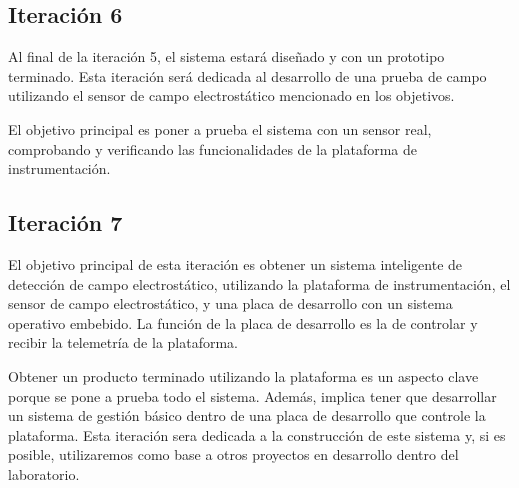\subsection{Iteración 6} %
\label{sub:iteracion_6}

Al final de la iteración 5, el sistema estará diseñado y con un prototipo terminado. Esta iteración será dedicada al desarrollo de una prueba de campo utilizando el sensor de campo electrostático mencionado en los objetivos. 

El objetivo principal es poner a prueba el sistema con un sensor real, comprobando y verificando las funcionalidades de la plataforma de instrumentación.



\subsection{Iteración 7} %
\label{sub:iteracion_7}

El objetivo principal de esta iteración es obtener un sistema inteligente de detección de campo electrostático, utilizando la plataforma de instrumentación, el sensor de campo electrostático, y una placa de desarrollo con un sistema operativo embebido. La función de la placa de desarrollo es la de controlar y recibir la telemetría de la plataforma. 

Obtener un producto terminado utilizando la plataforma es un aspecto clave porque se pone a prueba todo el sistema. Además, implica tener que desarrollar un sistema de gestión básico dentro de una placa de desarrollo que controle la plataforma. Esta iteración sera dedicada a la construcción de este sistema y, si es posible, utilizaremos como base a otros proyectos en desarrollo dentro del laboratorio.






